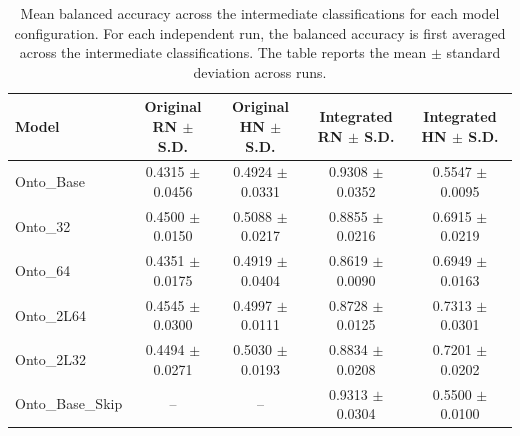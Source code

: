\begin{table}[t]
\centering
\begin{tabular}{l c c c c}
\toprule
Model & Original RN $\pm$ S.D. & Original HN $\pm$ S.D. & Integrated RN $\pm$ S.D. & Integrated HN $\pm$ S.D. \\
\midrule
Onto\_Base & 0.4315 $\pm$ 0.0456 & 0.4924 $\pm$ 0.0331 & 0.9308 $\pm$ 0.0352 & 0.5547 $\pm$ 0.0095 \\
Onto\_32 & 0.4500 $\pm$ 0.0150 & 0.5088 $\pm$ 0.0217 & 0.8855 $\pm$ 0.0216 & 0.6915 $\pm$ 0.0219 \\
Onto\_64 & 0.4351 $\pm$ 0.0175 & 0.4919 $\pm$ 0.0404 & 0.8619 $\pm$ 0.0090 & 0.6949 $\pm$ 0.0163 \\
Onto\_2L64 & 0.4545 $\pm$ 0.0300 & 0.4997 $\pm$ 0.0111 & 0.8728 $\pm$ 0.0125 & 0.7313 $\pm$ 0.0301 \\
Onto\_2L32 & 0.4494 $\pm$ 0.0271 & 0.5030 $\pm$ 0.0193 & 0.8834 $\pm$ 0.0208 & 0.7201 $\pm$ 0.0202 \\
Onto\_Base\_Skip & -- & -- & 0.9313 $\pm$ 0.0304 & 0.5500 $\pm$ 0.0100 \\
\bottomrule
\end{tabular}
\caption{Mean balanced accuracy across the intermediate classifications for each model configuration. For each independent run, the balanced accuracy is first averaged across the intermediate classifications. The table reports the mean $\pm$ standard deviation across runs.}
\label{tab:intermediate_balanced_accuracy_summary}
\end{table}